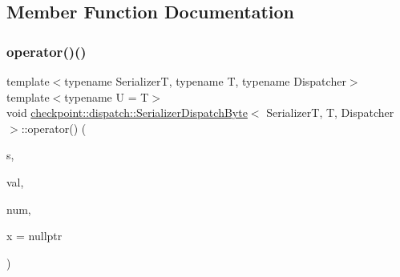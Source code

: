 \subsection{Member Function Documentation}
\mbox{\label{structcheckpoint_1_1dispatch_1_1_serializer_dispatch_byte_ab45639bcd8124d1057e074358f5ccc90}} 
\subsubsection{\texorpdfstring{operator()()}{operator()()}\hspace{0.1cm}{\footnotesize\ttfamily [1/2]}}
{\footnotesize\ttfamily template$<$typename SerializerT, typename T, typename Dispatcher$>$ \\
template$<$typename U  = T$>$ \\
void \hyperlink{structcheckpoint_1_1dispatch_1_1_serializer_dispatch_byte}{checkpoint\+::dispatch\+::\+Serializer\+Dispatch\+Byte}$<$ SerializerT, T, Dispatcher $>$\+::operator() (\begin{DoxyParamCaption}\item[{SerializerT \&}]{s,  }\item[{T $\ast$}]{val,  }\item[{\hyperlink{namespacecheckpoint_a083f6674da3f94c2901b18c6d238217c}{Serial\+Size\+Type}}]{num,  }\item[{\hyperlink{structcheckpoint_1_1dispatch_1_1_serializer_dispatch_byte_a6de610e1888790d04dbde87b243d7c7f}{is\+Byte\+Copy\+Type}$<$ U $>$ $\ast$}]{x = {\ttfamily nullptr} }\end{DoxyParamCaption})\hspace{0.3cm}{\ttfamily [inline]}}

\mbox{\label{structcheckpoint_1_1dispatch_1_1_serializer_dispatch_byte_ae94c1edf6bab8281506605824c95b3b1}} 
